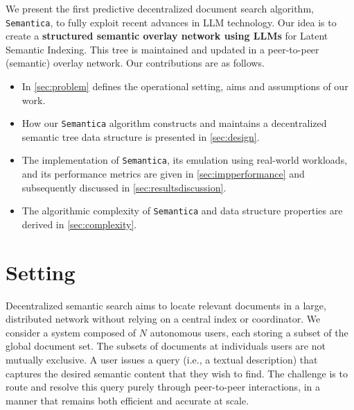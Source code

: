 \documentclass[10pt,journal]{IEEEtran}
\newcommand{\todo}[1]{\textcolor{red}{\textbf{[TODO: #1]}}}
\newcommand{\algorithmname}{\texttt{Semantica}}
\begin{document}
We present the first predictive decentralized document search algorithm, \algorithmname{}, to fully exploit recent advances in LLM technology.
Our idea is to create a \textbf{structured semantic overlay network using LLMs} for Latent Semantic Indexing.
This tree is maintained and updated in a peer-to-peer (semantic) overlay network.
Our contributions are as follows.

\begin{itemize}
    \item In \autoref{sec:problem} defines the operational setting, aims and assumptions of our work.
    \item How our \algorithmname{} algorithm constructs and maintains a decentralized semantic tree data structure is presented in \autoref{sec:design}.
    \item The implementation of \algorithmname{}, its emulation using real-world workloads, and its performance metrics are given in \autoref{sec:impperformance} and subsequently discussed in \autoref{sec:resultsdiscussion}.
    \item The algorithmic complexity of \algorithmname{} and data structure properties are derived in \autoref{sec:complexity}.
\end{itemize}



\section{Setting}
\label{sec:problem}

Decentralized semantic search aims to locate relevant documents in a large, distributed network without relying on a central index or coordinator. We consider a system composed of \(N\) autonomous users, each storing a subset of the global document set. The subsets of documents at individuals users are not mutually exclusive. %
A user issues a query (i.e., a textual description) that captures the desired semantic content that they wish to find. The challenge is to route and resolve this query purely through peer-to-peer interactions, in a manner that remains both efficient and accurate at scale.
\end{document}
